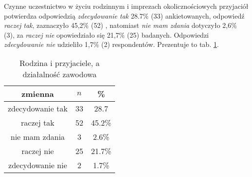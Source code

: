 
Czynne uczestnictwo w życiu rodzinnym i imprezach okolicznościowych przyjaciół potwierdza odpowiedzią \textit{zdecydowanie tak}  28.7\%   (33) ankietowanych, odpowiedź \textit{raczej tak},  zaznaczyło 45,2\% (52) , natomiast \textit{nie mam zdania} dotyczyło 2,6\% (3), za \textit{raczej nie} opowiedziało się  21,7\% (25) badanych. Odpowiedzi \textit{zdecydowanie nie} udzieliło 1,7\% (2) respondentów. Prezentuje to tab.  \ref{tab:Q24}.
\begin{table}[H]
\caption{Rodzina i przyjaciele, a działalność zawodowa}
\centering
\begin{tabular}{ | c | c | c |}
\hline
zmienna & $n$ & \% \\
\hline
zdecydowanie tak  &  33  & 28.7 \\
\hline
raczej tak  &  52  & 45.2\% \\
\hline
nie mam zdania  &  3  & 2.6\% \\
\hline
raczej nie  &  25  & 21.7\% \\
\hline
zdecydowanie nie  &  2  & 1.7\% \\
\hline
\end{tabular}
\label{tab:Q24}
\end{table}
